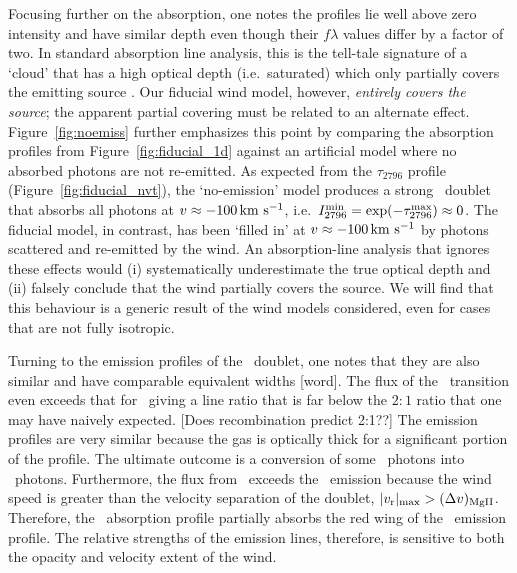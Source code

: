 \documentclass[12pt,preprint]{aastex}
\begin{document}
Focusing further on the  absorption, one notes the profiles lie
well above zero intensity and have similar depth even though their $f\lambda$
values differ by a factor of two.  In standard absorption line
analysis, this is 
the tell-tale signature of a `cloud' that has a high optical depth (i.e.\
saturated) which only partially covers the emitting source
\citep[e.g.][]{hamman10}.  Our fiducial wind model, however, 
{\it entirely covers the source}; the apparent partial covering must
be related to an alternate effect.
Figure~\ref{fig:noemiss} further emphasizes this point by comparing the 
absorption profiles from Figure~\ref{fig:fiducial_1d} against an
artificial model where no absorbed photons are not
re-emitted.   As expected from the
$\tau_{2796}$ profile (Figure~\ref{fig:fiducial_nvt}), the
`no-emission' model
produces a strong \mgiid\ doublet that absorbs all photons at
$v \approx -100 \, {\rm km~s^{-1}}$, i.e.\ $I_{2796}^{\rm min} = \exp(-\tau^{\rm
  max}_{2796}) \approx 0$.
The fiducial model, in contrast, has been `filled in' at $v \approx -100
\, {\rm km~s^{-1}}$ by photons scattered and re-emitted by the wind.  An
absorption-line analysis that ignores these effects
\citep[e.g.][]{sato} would (i) systematically underestimate the true optical
depth and (ii) falsely conclude that the wind partially covers the
source.  We will find that this
behaviour is a generic result of the wind models considered, even for cases that are
not fully isotropic.

Turning to the emission profiles of the \mgiid\ doublet, one notes
that they are also similar and have comparable equivalent widths
[word].  The
flux of the \mgiib\ transition even exceeds that for \mgiia\ giving a
line ratio that is far below the $2:1$ ratio that one may have naively
expected. 
[Does recombination predict 2:1??]
The emission profiles are very similar because the gas is optically
thick for a significant portion of the profile. 
The ultimate outcome is a conversion of some \mgiia\ photons into
\mgiib\ photons.
Furthermore, the flux from \mgiib\ exceeds the
\mgiia\ emission because the wind speed is greater than the velocity separation
of the doublet, $|v_{\rm r}|_{\rm max} > (\Delta v)_{\rm MgII}$.
Therefore,
the \mgiib\ absorption profile partially absorbs the red wing of the
\mgiia\ emission profile.  The relative strengths of the emission
lines, therefore, is sensitive to both the opacity and velocity
extent of the wind.  
\end{document}
